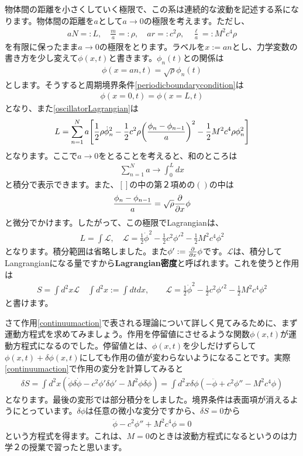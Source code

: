 \documentclass[report,paper=a4, fontsize=12pt, line_length=16cm, number_of_lines=33,dvipdfmx]{jlreq}
\numberwithin{equation}{chapter}
\newcommand{\strong}[1]{{\sffamily \bfseries #1}}
\newcommand{\Lcal}{\mathcal{L}}
\begin{document}
物体間の距離を小さくしていく極限で、この系は連続的な波動を記述する系になります。物体間の距離を$a$として$a\to 0$の極限を考えます。ただし、
\begin{align}
  aN=:L,\quad \frac{m}{a}=:\rho,\quad ar=:c^2\rho,\quad \frac{\ell}{a}=:M^2c^4 \rho \label{classicalcontinuum}
\end{align}
を有限に保ったまま$a\to 0$の極限をとります。ラベルを$x:=an$とし、力学変数の書き方を少し変えて$\phi(x,t)$と書きます。$\phi_n(t)$との関係は
\begin{align}
  \phi(x=an,t)=\sqrt{\rho}\phi_n(t)
\end{align}
とします。そうすると周期境界条件\eqref{periodicboundarycondition}は
\begin{align}
  \phi(x=0,t)=\phi(x=L,t)
\end{align}
となり、また\eqref{oscillatorLagrangian}は
\begin{align}
  L=\sum_{n=1}^{N}a\qty[
    \frac12 \rho \dot{\phi}_n^2-\frac12 c^2\rho\qty(\frac{\phi_{n}-\phi_{n-1}}{a})^2-\frac12 M^2c^4 \rho \phi_n^2
  ]
\end{align}
となります。ここで$a\to 0$をとることを考えると、和のところは
\begin{align}
  \sum_{n=1}^{N}a\to\int_{0}^{L}dx
\end{align}
と積分で表示できます。また、$[]$の中の第２項めの$()$の中は
\begin{align}
  \frac{\phi_n-\phi_{n-1}}{a}=\sqrt{\rho}\pdv{x}\phi
\end{align}
と微分でかけます。したがって、この極限でLagrangianは、
\begin{align}
  L=\int \Lcal,\quad 
  \Lcal=
    \frac12 \dot{\phi}^2-\frac12 c^2 \phi'^2-\frac12 M^2 c^4 \phi^2
\end{align}
となります。積分範囲は省略しました。また$\phi':=\pdv{x}\phi$です。$\Lcal$は、積分してLangrangianになる量ですから\strong{Lagrangian密度}と呼ばれます。これを使うと作用は
\begin{align}
  S=\int d^2x \Lcal
  \quad \int d^2x :=\int dt dx,\qquad
  \Lcal=\frac12 \dot{\phi}^2-\frac12 c^2 \phi'^2-\frac12 M^2c^4 \phi^2\label{continuumaction}
\end{align}
と書けます。

さて作用\eqref{continuumaction}で表される理論について詳しく見てみるために、まず運動方程式を求めてみましょう。作用を停留値にさせるような関数$\phi(x,t)$が運動方程式になるのでした。停留値とは、$\phi(x,t)$を少しだけずらして$\phi(x,t)+\delta \phi(x,t)$にしても作用の値が変わらないようになることです。実際\eqref{continuumaction}で作用の変分を計算してみると
\begin{align}
  \delta S
  =\int d^2x( \dot{\phi}\delta\dot{\phi}-c^2\phi'\delta \phi'-M^2\phi\delta \phi)
  =\int d^2x\delta \phi( -\ddot{\phi}+c^2\phi''-M^2c^4\phi)
\end{align}
となります。最後の変形では部分積分をしました。境界条件は表面項が消えるようにとっています。$\delta \phi$は任意の微小な変分ですから、$\delta S=0$から
\begin{align}
  \ddot{\phi}-c^2\phi''+M^2c^4\phi=0
  \label{eomKG2}
\end{align}
という方程式を得ます。これは、$M=0$のときは波動方程式になるというのは力学２の授業で習ったと思います。
\end{document}
